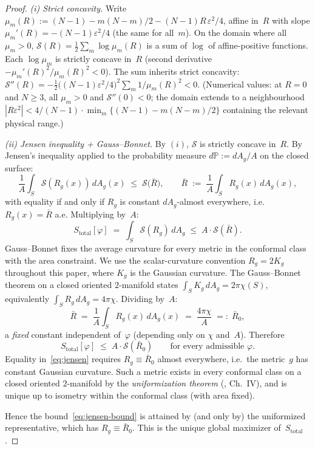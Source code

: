 \begin{proof}
\emph{(i) Strict concavity.}
Write $\mu_m(R) := (N{-}1) - m(N{-}m)/2 - (N{-}1)R\,\varepsilon^2/4$,
affine in~$R$ with slope
$\mu_m'(R) = -(N{-}1)\varepsilon^2/4$ (the same for all~$m$).
On the domain where all $\mu_m > 0$,
$\mathcal{S}(R) = \tfrac{1}{2}\sum_m \log \mu_m(R)$ is a sum of
$\log$ of affine-positive functions.  Each $\log \mu_m$ is
strictly concave in~$R$ (second derivative
$-\mu_m'(R)^2/\mu_m(R)^2 < 0$).  The sum inherits strict
concavity:
$\mathcal{S}''(R) = -\tfrac{1}{2}\bigl((N{-}1)\varepsilon^2/4\bigr)^2
\sum_m 1/\mu_m(R)^2 < 0$.
(Numerical values: at $R = 0$ and $N \ge 3$, all $\mu_m > 0$
and $\mathcal{S}''(0) < 0$; the domain extends to a neighbourhood
$|R \varepsilon^2| < 4/(N-1) \cdot \min_m\{(N-1) - m(N-m)/2\}$
containing the relevant physical range.)

\emph{(ii) Jensen inequality + Gauss--Bonnet.}
By $(i)$, $\mathcal{S}$ is strictly concave in~$R$.  By
Jensen's inequality applied to the probability measure
$d\mathbb{P} := dA_g/A$ on the closed surface:
\begin{equation}\label{eq:jensen}
  \frac{1}{A}\int_S \mathcal{S}(R_g(x))\,dA_g(x)
  \;\le\; \mathcal{S}\!\bigl(\bar R\bigr),
  \qquad
  \bar R \;:=\; \frac{1}{A}\int_S R_g(x)\,dA_g(x),
\end{equation}
with equality if and only if $R_g$ is constant $dA_g$-almost
everywhere, i.e.\ $R_g(x) = \bar R$ a.e.  Multiplying
by~$A$:
\[
  S_{\mathrm{total}}[\varphi] \;=\; \int_S \mathcal{S}(R_g)\,dA_g
  \;\le\; A \cdot \mathcal{S}(\bar R).
\]
Gauss--Bonnet fixes the average curvature for every metric in
the conformal class with the area constraint.  We use the
scalar-curvature convention $R_g = 2 K_g$ throughout this
paper, where $K_g$ is the Gaussian curvature.  The Gauss--Bonnet
theorem on a closed oriented $2$-manifold states
$\int_S K_g\,dA_g = 2\pi\chi(S)$, equivalently
$\int_S R_g\,dA_g = 4\pi\chi$.  Dividing by~$A$:
\[
  \bar R \;=\; \frac{1}{A}\int_S R_g(x)\,dA_g(x)
  \;=\; \frac{4\pi\chi}{A}
  \;=:\; \bar R_0,
\]
a \emph{fixed} constant independent of~$\varphi$ (depending
only on $\chi$ and~$A$).
Therefore
\begin{equation}\label{eq:jensen-bound}
  S_{\mathrm{total}}[\varphi]
  \;\le\; A \cdot \mathcal{S}(\bar R_0)
  \qquad \text{for every admissible } \varphi.
\end{equation}
Equality in~\eqref{eq:jensen} requires $R_g \equiv \bar R_0$
almost everywhere, i.e.\ the metric~$g$ has constant Gaussian
curvature.  Such a metric exists in every conformal class on
a closed oriented $2$-manifold by the \emph{uniformization
theorem} (\citealt{FarkasKra1992}, Ch.~IV), and is unique up
to isometry within the conformal class (with area fixed).

Hence the bound~\eqref{eq:jensen-bound} is attained by (and
only by) the uniformized representative, which has
$R_g \equiv \bar R_0$.  This is the unique global maximizer
of~$S_{\mathrm{total}}$.
\end{proof}

